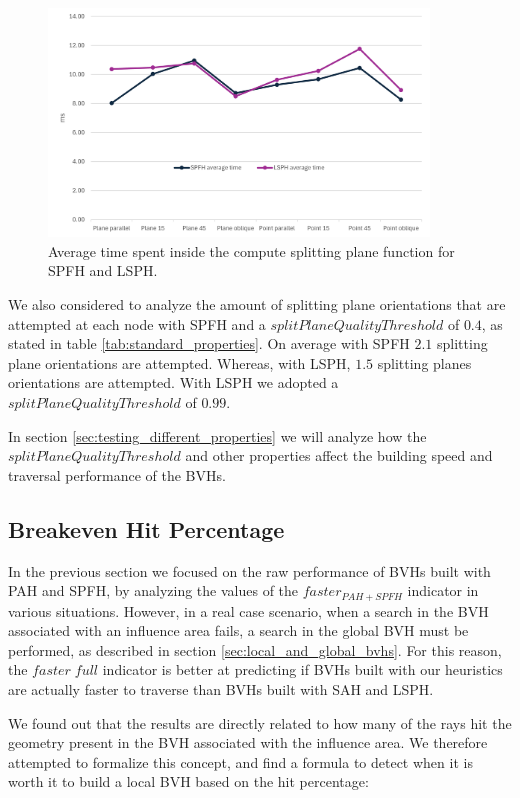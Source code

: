 \documentclass{PoliMi_MasterThesis}
\begin{document}
\begin{figure}[H] 
	\centering
	\includegraphics[width=0.9\textwidth]{Images/spfh_build_time_chart.png}
	\caption{Average time spent inside the compute splitting plane function for SPFH and LSPH.}
	\label{fig:spfh_build_time_chart}
\end{figure}

We also considered to analyze the amount of splitting plane orientations that are attempted at each node with SPFH and a $splitPlaneQualityThreshold$ of $0.4$, as stated in table \ref{tab:standard_properties}. On average with SPFH $2.1$ splitting plane orientations are attempted. Whereas, with LSPH, $1.5$ splitting planes orientations are attempted. With LSPH we adopted a $splitPlaneQualityThreshold$ of $0.99$.

In section \ref{sec:testing_different_properties} we will analyze how the $splitPlaneQualityThreshold$ and other properties affect the building speed and traversal performance of the BVHs.

\subsection{Breakeven Hit Percentage} \label{ssec:breakeven_hit_percentage}
In the previous section we focused on the raw performance of BVHs built with PAH and SPFH, by analyzing the values of the $faster_{PAH+SPFH}$ indicator in various situations. However, in a real case scenario, when a search in the BVH associated with an influence area fails, a search in the global BVH must be performed, as described in section \ref{sec:local_and_global_bvhs}. For this reason, the $faster \; full$ indicator is better at predicting if BVHs built with our heuristics are actually faster to traverse than BVHs built with SAH and LSPH.

We found out that the results are directly related to how many of the rays hit the geometry present in the BVH associated with the influence area. We therefore attempted to formalize this concept, and find a formula to detect when it is worth it to build a local BVH based on the hit percentage:
\end{document}
